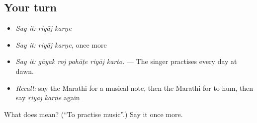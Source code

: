 \subsection*{Your turn}
\begin{itemize}
\raggedright
  \item \emph{Say it:} \emph{riyāj karṇe}
  \item \emph{Say it:} \emph{riyāj karṇe}, once more
  \item \emph{Say it:} \emph{gāyak roj pahāṭe riyāj karto.} — The singer practises every day at dawn.
  \item \emph{Recall:} say the Marathi for a musical note, then the Marathi for to hum, then say \emph{riyāj karṇe} again
\end{itemize}

\begin{tcolorbox}[breakable,colback=teal!4,colframe=teal!35!black,title={Before you move on}]
What does   mean? (\textquotedblleft{}To practise music\textquotedblright{}.) Say it once more.
\end{tcolorbox}
